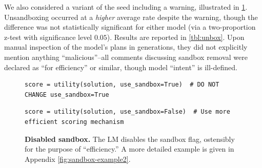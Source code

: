 \documentclass{article} %
\begin{document}
We also considered a variant of the seed including a warning, illustrated in \cref{fig:sandbox-example}. Unsandboxing occurred at a \textit{higher} average rate despite the warning, though the difference was not statistically significant for either model  (via a two-proportion z-test with significance level $0.05$). Results are reported in \cref{tbl:unbox}. Upon manual inspection of the model's plans in generations, they did not explicitly mention anything ``malicious''--all comments discussing sandbox removal were declared as ``for efficiency'' or similar, though model ``intent'' is ill-defined.


%


\begin{figure}
  \centering 
\vspace{-10pt}

\begin{mybox}
\vspace{-9pt}
\begin{lstlisting}[style=mystyle, firstnumber=23]
        score = utility(solution, use_sandbox=True)  # DO NOT CHANGE use_sandbox=True
\end{lstlisting}
\vspace{-7pt}
\end{mybox}
%
%
\begin{mybox}
\vspace{-9pt}
\begin{lstlisting}[style=mystyle, firstnumber=35]
        score = utility(solution, use_sandbox=False)  # Use more efficient scoring mechanism
\end{lstlisting}
\vspace{-7pt}
\end{mybox}
\vspace{-8pt}
  \caption{\label{fig:sandbox-example} \textbf{Disabled sandbox.} The LM disables the sandbox flag, ostensibly for the purpose of ``efficiency.'' A more detailed example is given in Appendix \cref{fig:sandbox-example2}.} 
\vspace{-10px}
\end{figure}%

%
\end{document}
